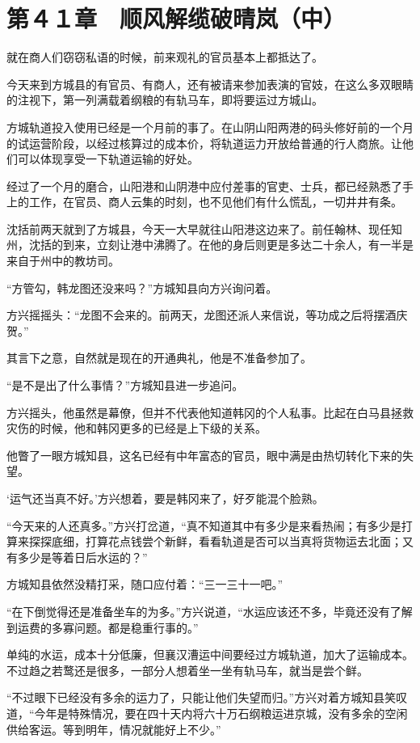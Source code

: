 \section{第４１章　顺风解缆破晴岚（中）}

就在商人们窃窃私语的时候，前来观礼的官员基本上都抵达了。

今天来到方城县的有官员、有商人，还有被请来参加表演的官妓，在这么多双眼睛的注视下，第一列满载着纲粮的有轨马车，即将要运过方城山。

方城轨道投入使用已经是一个月前的事了。在山阴山阳两港的码头修好前的一个月的试运营阶段，以经过核算过的成本价，将轨道运力开放给普通的行人商旅。让他们可以体现享受一下轨道运输的好处。

经过了一个月的磨合，山阳港和山阴港中应付差事的官吏、士兵，都已经熟悉了手上的工作，在官员、商人云集的时刻，也不见他们有什么慌乱，一切井井有条。

沈括前两天就到了方城县，今天一大早就往山阳港这边来了。前任翰林、现任知州，沈括的到来，立刻让港中沸腾了。在他的身后则更是多达二十余人，有一半是来自于州中的教坊司。

“方管勾，韩龙图还没来吗？”方城知县向方兴询问着。

方兴摇摇头：“龙图不会来的。前两天，龙图还派人来信说，等功成之后将摆酒庆贺。”

其言下之意，自然就是现在的开通典礼，他是不准备参加了。

“是不是出了什么事情？”方城知县进一步追问。

方兴摇头，他虽然是幕僚，但并不代表他知道韩冈的个人私事。比起在白马县拯救灾伤的时候，他和韩冈更多的已经是上下级的关系。

他瞥了一眼方城知县，这名已经有中年富态的官员，眼中满是由热切转化下来的失望。

‘运气还当真不好。’方兴想着，要是韩冈来了，好歹能混个脸熟。

“今天来的人还真多。”方兴打岔道，“真不知道其中有多少是来看热闹；有多少是打算来探探底细，打算花点钱尝个新鲜，看看轨道是否可以当真将货物运去北面；又有多少是等着日后水运的？”

方城知县依然没精打采，随口应付着：“三一三十一吧。”

“在下倒觉得还是准备坐车的为多。”方兴说道，“水运应该还不多，毕竟还没有了解到运费的多寡问题。都是稳重行事的。”

单纯的水运，成本十分低廉，但襄汉漕运中间要经过方城轨道，加大了运输成本。不过趋之若鹜还是很多，一部分人想着坐一坐有轨马车，就当是尝个鲜。

“不过眼下已经没有多余的运力了，只能让他们失望而归。”方兴对着方城知县笑叹道，“今年是特殊情况，要在四十天内将六十万石纲粮运进京城，没有多余的空闲供给客运。等到明年，情况就能好上不少。”

